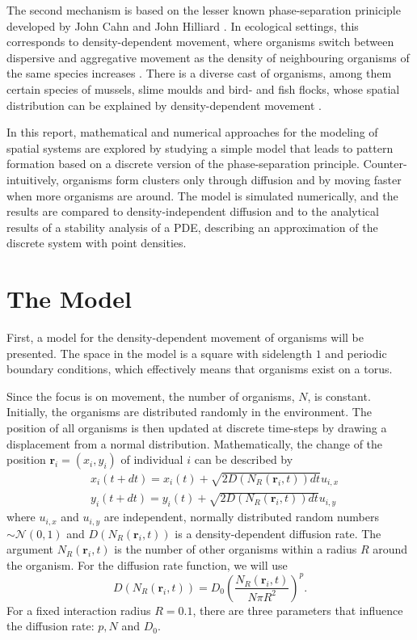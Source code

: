 \documentclass{article}
\renewcommand{\vec}[1]{\boldsymbol{#1}}
\begin{document}
The second mechanism is based on the lesser known phase-separation priniciple developed by John Cahn and John Hilliard \autocite{cahnFreeEnergyNonuniform1958}. 
In ecological settings, this corresponds to density-dependent movement, where organisms switch between dispersive and aggregative movement as the density of neighbouring organisms of the same species increases \autocite{liuPhaseSeparationDriven2016}.
There is a diverse cast of organisms, among them certain species of mussels, slime moulds and bird- and fish flocks, whose spatial distribution can be explained by density-dependent movement \autocite{liuPhaseSeparationDriven2016}.

In this report, mathematical and numerical approaches for the modeling of spatial systems are explored by studying a simple model that leads to pattern formation based on a discrete version of the phase-separation principle.
Counter-intuitively, organisms form clusters only through diffusion and by moving faster when more organisms are around.
The model is simulated numerically, and the results are compared to density-independent diffusion and to the analytical results of a stability analysis of a PDE, describing an approximation of the discrete system with point densities.


\section{The Model}
First, a model for the density-dependent movement of organisms will be presented. 
The space in the model is a square with sidelength $1$ and periodic boundary conditions, which effectively means that organisms exist on a torus.

Since the focus is on movement, the number of organisms, $N$, is constant.
Initially, the organisms are distributed randomly in the environment. 
The position of all organisms is then updated at discrete time-steps by drawing a displacement from a normal distribution.
Mathematically, the change of the position $\vec{r}_i = (x_i, y_i)$ of individual $i$ can be described by
\begin{align}
    & x_i(t + dt) = x_i(t) + \sqrt{2D(N_R(\vec{r}_i, t)) dt} u_{i,x} \label{sysx}\\
    & y_i(t + dt) = y_i(t) + \sqrt{2D(N_R(\vec{r}_i, t)) dt} u_{i,y} \label{sysy}
\end{align}
where $u_{i,x}$ and $u_{i,y}$ are independent, normally distributed random numbers $\sim \mathcal{N}(0,1)$ and $D(N_R(\vec{r}_i, t))$ is a density-dependent diffusion rate.
The argument $N_R(\vec{r}_i, t)$ is the number of other organisms within a radius $R$ around the organism. 
For the diffusion rate function, we will use
\begin{equation}
    D(N_R(\vec{r}_i, t)) = D_0\left( \frac{N_R(\vec{r}_i, t)}{N\pi R^2} \right)^p.
\end{equation}
For a fixed interaction radius $R=0.1$, there are three parameters that influence the diffusion rate: $p, N$ and $D_0$.
\end{document}
